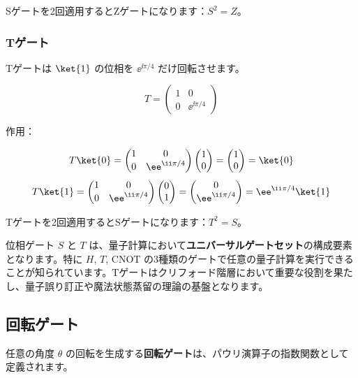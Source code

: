 Sゲートを2回適用するとZゲートになります：$S^2 = Z$。

\subsubsection{Tゲート}

Tゲートは $\ket{1}$ の位相を $\ee^{\ii\pi/4}$ だけ回転させます。

\[
T = \begin{pmatrix} 1 & 0 \\ 0 & \ee^{\ii\pi/4} \end{pmatrix}
\]

作用：

\[
T \ket{0} = \begin{pmatrix} 1 & 0 \\ 0 & \ee^{\ii\pi/4} \end{pmatrix} \begin{pmatrix} 1 \\ 0 \end{pmatrix} = \begin{pmatrix} 1 \\ 0 \end{pmatrix} = \ket{0}
\]
\[
T \ket{1} = \begin{pmatrix} 1 & 0 \\ 0 & \ee^{\ii\pi/4} \end{pmatrix} \begin{pmatrix} 0 \\ 1 \end{pmatrix} = \begin{pmatrix} 0 \\ \ee^{\ii\pi/4} \end{pmatrix} = \ee^{\ii\pi/4} \ket{1}
\]

Tゲートを2回適用するとSゲートになります：$T^2 = S$。

\begin{notebox}
位相ゲート $S$ と $T$ は、量子計算において\textbf{ユニバーサルゲートセット}の構成要素となります。特に $H$, $T$, $\mathrm{CNOT}$ の3種類のゲートで任意の量子計算を実行できることが知られています。Tゲートはクリフォード階層において重要な役割を果たし、量子誤り訂正や魔法状態蒸留の理論の基盤となります。
\end{notebox}

\subsection{回転ゲート}

任意の角度 $\theta$ の回転を生成する\textbf{回転ゲート}は、パウリ演算子の指数関数として定義されます。


